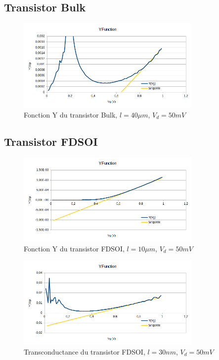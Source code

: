 \documentclass[a4paper,11pt]{report}
\begin{document}
\subsection{Transistor Bulk}
\begin{figure}[h]
    \begin{center}
        \includegraphics[width=0.8\textwidth]{Images/Bulk40-YFunction}
        \caption{Fonction Y du transistor Bulk, $l=40\mu m$, $V_d = 50mV$}
        \label{yfun_fdsoi_30nm}
    \end{center}
\end{figure}

\subsection{Transistor FDSOI}
\begin{figure}[h]
    \begin{center}
        \includegraphics[width=0.8\textwidth]{Images/FD1-10-YFunction}
        \caption{Fonction Y du transistor FDSOI, $l=10\mu m$, $V_d = 50mV$}
        \label{yfun_fdsoi_30nm}
    \end{center}
\end{figure}
\begin{figure}[h]
    \begin{center}
        \includegraphics[width=0.8\textwidth]{Images/FD11-30-YFunction}
        \caption{Transconductance du transistor FDSOI, $l=30nm$, $V_d = 50mV$}
        \label{transc_fdsoi_30nm}
    \end{center}
\end{figure}
\end{document}
